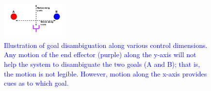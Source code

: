 \documentclass[conference]{IEEEtran}
\begin{document}

\begin{figure}
	\begin{center}
		\vspace{-0.2cm}
		\includegraphics[width=0.3\textwidth]{./figures/DE_NEW1.png}
	\end{center}
	\vspace{-.85cm}
	\caption{\textcolor{blue}{Illustration of goal disambiguation along various control dimensions. Any motion of the end effector (purple) along the y-axis will not help the system to disambiguate the two goals (A and B); that is, the motion is not legible. However, motion along the x-axis provides cues as to which goal.}}
	\label{DE}
\end{figure}
\end{document}

